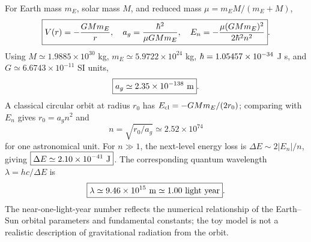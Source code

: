 For Earth mass $m_E$, solar mass $M$, and
reduced mass $\mu=m_EM/(m_E+M)$,
\begin{equation}
\boxed{V(r)=-\frac{GMm_E}{r},\quad
a_g=\frac{\hbar^2}{\mu GMm_E},\quad
E_n=-\frac{\mu(GMm_E)^2}{2\hbar^2n^2}}.
\end{equation}
Using $M\simeq1.9885\times10^{30}$ kg,
$m_E\simeq5.9722\times10^{24}$ kg,
$\hbar=1.05457\times10^{-34}$ J s, and
$G\simeq6.6743\times10^{-11}$ SI units,
\begin{equation}
\boxed{a_g\simeq2.35\times10^{-138}\ {\rm m}}.
\end{equation}
A classical circular orbit at radius $r_0$ has
$E_{\rm cl}=-GMm_E/(2r_0)$; comparing with $E_n$
gives $r_0=a_gn^2$ and
\begin{equation}
\boxed{n=\sqrt{r_0/a_g}\simeq
2.52\times10^{74}}
\end{equation}
for one astronomical unit.
For $n\gg1$, the next-level energy loss is
$\Delta E\sim2|E_n|/n$, giving
$\boxed{\Delta E\simeq2.10\times10^{-41}\ {\rm J}}$.
The corresponding quantum wavelength
$\lambda=hc/\Delta E$ is
\begin{equation}
\boxed{\lambda\simeq9.46\times10^{15}\ {\rm m}
\simeq1.00\ {\rm light\ year}}.
\end{equation}
The near-one-light-year number reflects
the numerical relationship of the
Earth--Sun orbital parameters and
fundamental constants; the toy model
is not a realistic description of
gravitational radiation from the orbit.
